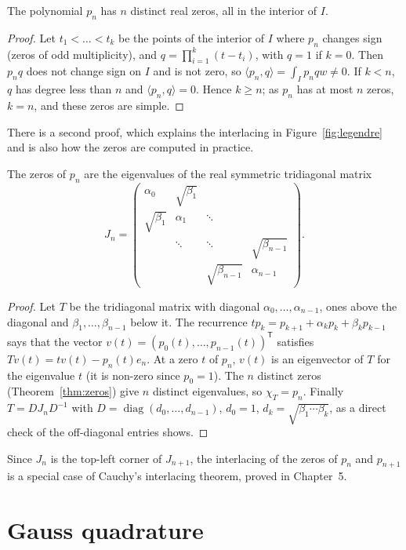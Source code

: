 \begin{theorem}[zeros]\label{thm:zeros}
The polynomial $p_n$ has $n$ distinct real zeros, all in the interior of $I$.
\end{theorem}
\begin{proof}
Let $t_1<\dots<t_k$ be the points of the interior of $I$ where $p_n$ changes sign (zeros of odd multiplicity), and
$q=\prod_{i=1}^k(t-t_i)$, with $q=1$ if $k=0$. Then $p_nq$ does not change sign on $I$ and is not zero, so
$\langle p_n,q\rangle=\int_Ip_nqw\ne0$. If $k<n$, $q$ has degree less than $n$ and $\langle p_n,q\rangle=0$. Hence $k\ge n$;
as $p_n$ has at most $n$ zeros, $k=n$, and these zeros are simple.
\end{proof}

There is a second proof, which explains the interlacing in Figure~\ref{fig:legendre} and is also how the zeros are
computed in practice.

\begin{proposition}\label{prop:jacobi}
The zeros of $p_n$ are the eigenvalues of the real symmetric tridiagonal matrix
\[
J_n=\begin{pmatrix}\alpha_0&\sqrt{\beta_1}&&\\\sqrt{\beta_1}&\alpha_1&\ddots&\\&\ddots&\ddots&\sqrt{\beta_{n-1}}\\
&&\sqrt{\beta_{n-1}}&\alpha_{n-1}\end{pmatrix}.
\]
\end{proposition}
\begin{proof}
Let $T$ be the tridiagonal matrix with diagonal $\alpha_0,\dots,\alpha_{n-1}$, ones above the diagonal and
$\beta_1,\dots,\beta_{n-1}$ below it. The recurrence $tp_k=p_{k+1}+\alpha_kp_k+\beta_kp_{k-1}$ says that the vector
$v(t)=(p_0(t),\dots,p_{n-1}(t))^{\mathsf T}$ satisfies $Tv(t)=tv(t)-p_n(t)e_n$. At a zero $t$ of $p_n$, $v(t)$ is an
eigenvector of $T$ for the eigenvalue $t$ (it is non-zero since $p_0=1$). The $n$ distinct zeros (Theorem~\ref{thm:zeros})
give $n$ distinct eigenvalues, so $\chi_T=p_n$. Finally $T=DJ_nD^{-1}$ with $D=\operatorname{diag}(d_0,\dots,d_{n-1})$,
$d_0=1$, $d_k=\sqrt{\beta_1\cdots\beta_k}$, as a direct check of the off-diagonal entries shows.
\end{proof}

Since $J_n$ is the top-left corner of $J_{n+1}$, the interlacing of the zeros of $p_n$ and $p_{n+1}$ is a special case of
Cauchy's interlacing theorem, proved in Chapter~5.

\section{Gauss quadrature}

